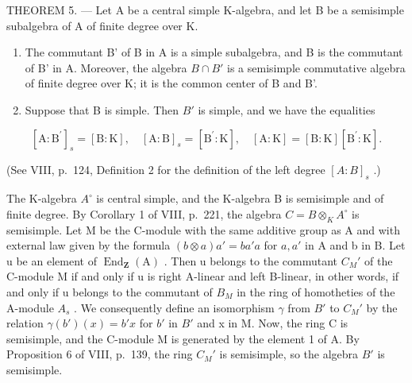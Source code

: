 THEOREM 5. --- Let A be a central simple K-algebra, and let B be a semisimple subalgebra of A of finite degree over K.

\begin{enumerate}
\def\labelenumi{\alph{enumi})}
\item
  The commutant B' of B in A is a simple subalgebra, and B is the commutant of B' in A. Moreover, the algebra \(B \cap B'\) is a semisimple commutative algebra of finite degree over K; it is the common center of B and B'.
\item
  Suppose that B is simple. Then \(B'\) is simple, and we have the equalities
\end{enumerate}

\[
[ \mathrm{A}: \mathrm{B} ^ {\prime} ] _ {s} = [ \mathrm{B}: \mathrm{K} ], \quad [ \mathrm{A}: \mathrm{B} ] _ {s} = [ \mathrm{B} ^ {\prime}: \mathrm{K} ], \quad [ \mathrm{A}: \mathrm{K} ] = [ \mathrm{B}: \mathrm{K} ] [ \mathrm{B} ^ {\prime}: \mathrm{K} ].
\]

(See VIII, p.~124, Definition 2 for the definition of the left degree \([A : B]_s\) .)

The K-algebra \(A^{\circ}\) is central simple, and the K-algebra B is semisimple and of finite degree. By Corollary 1 of VIII, p.~221, the algebra \(C = B \otimes_{K} A^{\circ}\) is semisimple. Let M be the C-module with the same additive group as A and with external law given by the formula \((b \otimes a)a' = ba'a\) for \(a, a'\) in A and b in B. Let u be an element of \(\operatorname{End}_{\mathbf{Z}}(\mathrm{A})\) . Then u belongs to the commutant \(C_{M}'\) of the C-module M if and only if u is right A-linear and left B-linear, in other words, if and only if u belongs to the commutant of \(B_{M}\) in the ring of homotheties of the A-module \(A_{s}\) . We consequently define an isomorphism \(\gamma\) from \(B'\) to \(C_{M}'\) by the relation \(\gamma(b')(x) = b'x\) for \(b'\) in \(B'\) and x in M. Now, the ring C is semisimple, and the C-module M is generated by the element 1 of A. By Proposition 6 of VIII, p.~139, the ring \(C_{M}'\) is semisimple, so the algebra \(B'\) is semisimple.

